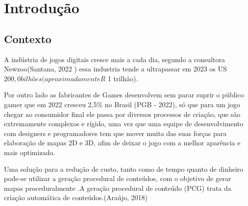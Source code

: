 \documentclass[12pt]{tcc}
\begin{document}

\dcover

\dcoverback
	
		




\dtables
	

\justifying
	
\chapter{Introdução}
\label{sec:introducao}

\section{Contexto}

A indústria de jogos digitais cresce mais a cada dia, segundo a consultora Newzoo(Santana, 2022 ) essa industria tende a ultrapassar em 2023 os US$ 200,0 bilhões (aproximadamente R$ 1 trilhão).

Por outro lado as fabricantes de Games desenvolvem sem parar suprir o público gamer que em 2022 cresceu 2,5\% no Brasil (PGB - 2022), só que para um jogo chegar ao consumidor final ele passa por diversos processos de criação, que são extremamente complexos e rígido, uma vez que uma equipe de desenvolvimento com designers e programadores tem que mover muita das suas forças para elaboração de mapas 2D e 3D, afim de deixar o jogo com a melhor aparência e mais optimizado. 

Uma solução para a redução de custo, tanto como de tempo quanto de dinheiro pode-se utilizar a geração procedural de conteúdos, com o objetivo de gerar mapas proceduralmente .A geração procedural de conteúdo (PCG) trata da criação automática de conteúdos.(Araújo, 2018) 
\end{document}
